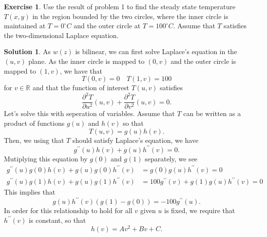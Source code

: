 \documentclass[12pt]{article}
\newcommand{\bbR}{\mathbb{R}}
\theoremstyle{definition}
\newtheorem{exer}{Exercise}
\newtheorem{sol}{Solution}
\theoremstyle{remark}
\begin{document}
\newpage

\begin{exer}   
Use the result of problem 1 to find the steady state temperature $T(x,y)$ in the region bounded by the two circles, where the inner circle is maintained at $T=0 ^\circ C$ and the outer circle at $T=100 ^\circ C$. Assume that $T$ satisfies the two-dimensional Laplace equation.
\end{exer}

\begin{sol}
    As $w(z)$ is bilinear, we can first solve Laplace's equation in the $(u,v)$ plane. As the inner circle is mapped to $(0,v)$ and the outer circle is mapped to $(1,v)$, we have that
    \begin{equation*}
        T(0,v) = 0 \quad T(1,v) = 100 
    \end{equation*}
for $v\in\bbR$ and that the function of interest $T(u,v)$ satisfies
    \begin{equation*}
        \frac{\partial^{2} T}{\partial u^{2}}(u,v) + \frac{\partial^{2} T}{\partial v^{2}}(u,v) = 0.
    \end{equation*}
    Let's solve this with seperation of variables. Assume that $T$ can be written as a product of functions $g(u)$ and $h(v)$ so that
\begin{equation*}
    T(u,v) = g(u)h(v).
\end{equation*}
Then, we using that $T$ should satisfy Laplace's equation, we have 
\begin{equation*}
    g^{\prime \prime}(u) h(v) + g(u)h^{\prime \prime}(v) = 0.
\end{equation*}
Mutiplying this equation by $g(0)$ and $g(1)$ separately, we see
\begin{align*}
    g^{\prime \prime}(u) g(0)h(v) + g(u)g(0)h^{\prime \prime}(v) &= g(0)g(u)h^{\prime \prime}(v) = 0\\
    g^{\prime \prime}(u) g(1)h(v) + g(u)g(1)h^{\prime \prime}(v) &= 100  g^{\prime \prime}(v) + g(1)g(u) h^{\prime \prime}(v) = 0
\end{align*}
This implies that
\begin{equation*}
    g(u)h^{\prime \prime}(v) \left(g(1)  - g(0)   \right) = - 100  g^{\prime \prime}(u).
\end{equation*}
In order for this relationship to hold for all $v$ given $u$ is fixed, we require that $h^{\prime \prime}(v)$ is constant, so that
\begin{equation*}
    h(v) = A v^{2} + Bv + C.
\end{equation*}

\end{sol}
\end{document}
